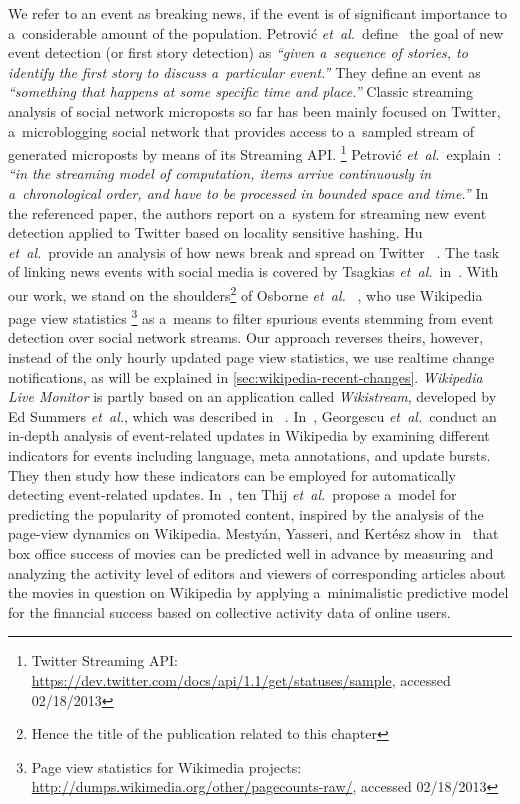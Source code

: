 We refer to an event as breaking news, if the event is of significant importance
to a~considerable amount of the population.
Petrovi\'{c} \emph{et~al.}\ define~\cite{petrovic2010streamingfirststory}
the goal of new event detection (or first story detection) as
\textit{``given a~sequence of stories, to identify the first story
to discuss a~particular event.''}
They define an event as \textit{``something that happens
at some specific time and place.''}
Classic streaming analysis of social network microposts so far has been mainly
focused on Twitter, a~microblogging social network that provides access
to a~sampled stream of generated microposts by means of its Streaming API.%
\footnote{Twitter Streaming API:
\url{https://dev.twitter.com/docs/api/1.1/get/statuses/sample},
accessed 02/18/2013}
Petrovi\'{c} \emph{et~al.}\ explain~\cite{petrovic2010streamingfirststory}:
\textit{``in the streaming model of computation,
items arrive continuously in a~chronological order, and have to be
processed in bounded space and time.''}
In the referenced paper, the authors report on a~system for streaming
new event detection applied to Twitter based on locality sensitive hashing.
Hu \emph{et~al.}\ provide an analysis of how news break and spread on Twitter~%
\cite{hu2012breakingnews}.
The task of linking news events with social media is covered by Tsagkias
\emph{et~al.}\ in~\cite{tsagkias2011linkingonlinenews}.
With our work, we stand on the shoulders\footnote{Hence the title of the publication related to this chapter}
of Osborne \emph{et~al.}\ %
\cite{osborne2012bieber}, who use Wikipedia page view statistics%
\footnote{Page view statistics for Wikimedia projects:
\url{http://dumps.wikimedia.org/other/pagecounts-raw/},
accessed 02/18/2013}
as a~means to filter spurious events
stemming from event detection over social network streams.
Our approach reverses theirs, however, instead of the only hourly updated
page view statistics, we use realtime change notifications,
as will be explained in \autoref{sec:wikipedia-recent-changes}.
\emph{Wikipedia Live Monitor} is partly based on an application called
\emph{Wikistream}, developed by Ed Summers \emph{et~al.}, which was described in~%
\cite{summers2011odetonode}.
In~\cite{georgescu2013extractingwikipedia}, Georgescu
\emph{et~al.}\ conduct an in-depth analysis of
event-related updates in Wikipedia by examining
different indicators for events including language,
meta annotations, and update bursts.
They then study how these indicators can be employed
for automatically detecting event-related updates.
In~\cite{tenthij2012modelingwikipedia}, ten Thij
\emph{et~al.}\ propose a~model for predicting the popularity
of promoted content, inspired by the analysis of
the page-view dynamics on Wikipedia. 
Mestyán, Yasseri, and Kertész show
in~\cite{mestyan2012boxoffice} that box office success of
movies can be predicted well in advance by measuring
and analyzing the activity level of editors and viewers
of corresponding articles about the movies in question on Wikipedia
by applying a~minimalistic predictive model
for the financial success based on
collective activity data of online users.

